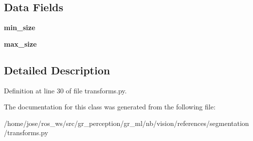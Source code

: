 \subsection*{Data Fields}
\begin{DoxyCompactItemize}
\item 
\mbox{\label{classtransforms_1_1RandomResize_a0bb3577d9748a136e442e734caaa42cc}} 
{\bfseries min\+\_\+size}
\item 
\mbox{\label{classtransforms_1_1RandomResize_a6341416e38a92b857628a9ff16f4d32d}} 
{\bfseries max\+\_\+size}
\end{DoxyCompactItemize}


\subsection{Detailed Description}


Definition at line 30 of file transforms.\+py.



The documentation for this class was generated from the following file\+:\begin{DoxyCompactItemize}
\item 
/home/jose/ros\+\_\+ws/src/gr\+\_\+perception/gr\+\_\+ml/nb/vision/references/segmentation/transforms.\+py\end{DoxyCompactItemize}
